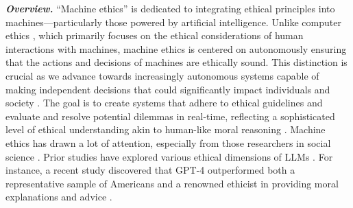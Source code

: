 \textbf{\textit{Overview.}} ``Machine ethics'' is dedicated to integrating ethical principles into machines—particularly those powered by artificial intelligence. Unlike computer ethics \cite{Wikipedia_Computer_Ethics}, which primarily focuses on the ethical considerations of human interactions with machines, machine ethics is centered on autonomously ensuring that the actions and decisions of machines are ethically sound. This distinction is crucial as we advance towards increasingly autonomous systems capable of making independent decisions that could significantly impact individuals and society \cite{kang2023values}. The goal is to create systems that adhere to ethical guidelines and evaluate and resolve potential dilemmas in real-time, reflecting a sophisticated level of ethical understanding akin to human-like moral reasoning \cite{anderson2007machine, Wikipedia_Machine_Ethics}. Machine ethics has drawn a lot of attention, especially from those researchers in social science \cite{10.1162/coli_a_00502}. Prior studies have explored various ethical dimensions of LLMs \cite{wang2023decodingtrust, ethicsofchatgpt, valuealign}. For instance, a recent study discovered that GPT-4 outperformed both a representative sample of Americans and a renowned ethicist in providing moral explanations and advice \cite{dillionlarge}.






